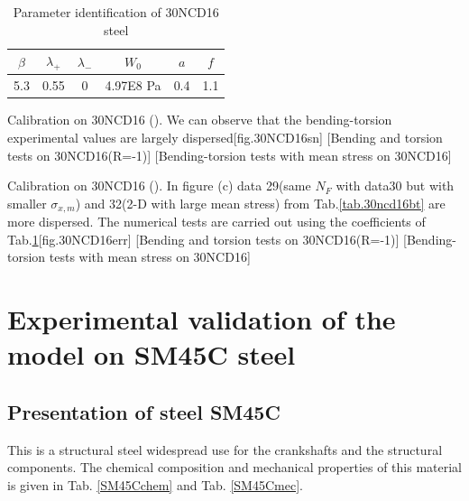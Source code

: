 \documentclass[3p,times,procedia,number]{elsarticle}
\begin{document}
\begin{table}[!h]
	\centering
	\begin{tabular}{|c|c|c|c|c|c|}
		\hline
		\textbf{$\beta$} & \textbf{$\lambda_+$} & \textbf{$\lambda_-$} & \textbf{$W_0$} & \textbf{$a$}& \textbf{$f$}  \\ \hline
		5.3     & 0.55 &0         &4.97E8 Pa  & 0.4& 1.1   \\ \hline
	\end{tabular}
	\caption{Parameter identification of 30NCD16 steel}
	\label{30ncdpara2}
\end{table}

\begin{Figure}[!h]{Calibration on  30NCD16 (\cite{Dubar1992}). We can observe that the bending-torsion experimental values are largely dispersed}[fig.30NCD16sn]
	[Bending and torsion tests on 30NCD16(R=-1)]
	[Bending-torsion tests with mean stress on 30NCD16]
\end{Figure}

\begin{Figure}[!h]{Calibration on  30NCD16 (\cite{Dubar1992}). In figure (c) data 29(same $N_F$ with data30 but with smaller $\sigma_{x,m}$) and 32(2-D with large mean stress)  from Tab.\ref{tab.30ncd16bt} are more dispersed. The numerical tests are carried out using the coefficients of Tab.\ref{30ncdpara2}}[fig.30NCD16err]
	[Bending and torsion tests on 30NCD16(R=-1)]
	[Bending-torsion tests with mean stress on 30NCD16]
\end{Figure}


\clearpage
\section{Experimental validation of the model on SM45C steel}
\subsection{Presentation of steel SM45C}
This is a structural steel widespread use for the crankshafts and the structural components. The chemical composition and mechanical properties of this material is given in Tab. \ref{SM45Cchem} and Tab. \ref{SM45Cmec}.
\end{document}
